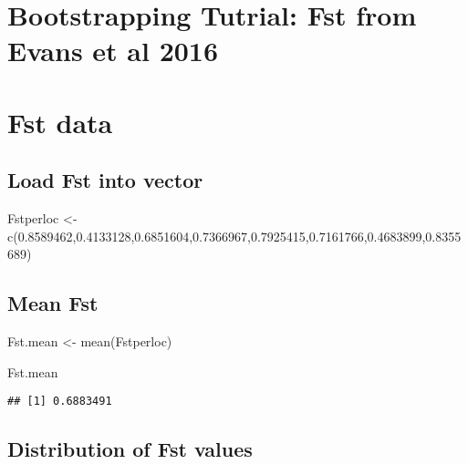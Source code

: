 \documentclass[
]{book}
\newenvironment{Shaded}{\begin{snugshade}}{\end{snugshade}}
\newcommand{\FloatTok}[1]{\textcolor[rgb]{0.00,0.00,0.81}{#1}}
\newcommand{\FunctionTok}[1]{\textcolor[rgb]{0.00,0.00,0.00}{#1}}
\newcommand{\NormalTok}[1]{#1}
\newcommand{\OtherTok}[1]{\textcolor[rgb]{0.56,0.35,0.01}{#1}}
\begin{document}
\hypertarget{bootstrapping-tutrial-fst-from-evans-et-al-2016}{%
\chapter{Bootstrapping Tutrial: Fst from Evans et al 2016}\label{bootstrapping-tutrial-fst-from-evans-et-al-2016}}

\hypertarget{fst-data}{%
\chapter{Fst data}\label{fst-data}}

\hypertarget{load-fst-into-vector}{%
\section{Load Fst into vector}\label{load-fst-into-vector}}

\begin{Shaded}
\begin{Highlighting}[]
\NormalTok{Fstperloc }\OtherTok{\textless{}{-}} \FunctionTok{c}\NormalTok{(}\FloatTok{0.8589462}\NormalTok{,}\FloatTok{0.4133128}\NormalTok{,}\FloatTok{0.6851604}\NormalTok{,}\FloatTok{0.7366967}\NormalTok{,}\FloatTok{0.7925415}\NormalTok{,}\FloatTok{0.7161766}\NormalTok{,}\FloatTok{0.4683899}\NormalTok{,}\FloatTok{0.8355689}\NormalTok{)}
\end{Highlighting}
\end{Shaded}

\hypertarget{mean-fst}{%
\section{Mean Fst}\label{mean-fst}}

\begin{Shaded}
\begin{Highlighting}[]
\NormalTok{Fst.mean }\OtherTok{\textless{}{-}} \FunctionTok{mean}\NormalTok{(Fstperloc)}

\NormalTok{Fst.mean}
\end{Highlighting}
\end{Shaded}

\begin{verbatim}
## [1] 0.6883491
\end{verbatim}

\hypertarget{distribution-of-fst-values}{%
\section{Distribution of Fst values}\label{distribution-of-fst-values}}
\end{document}
